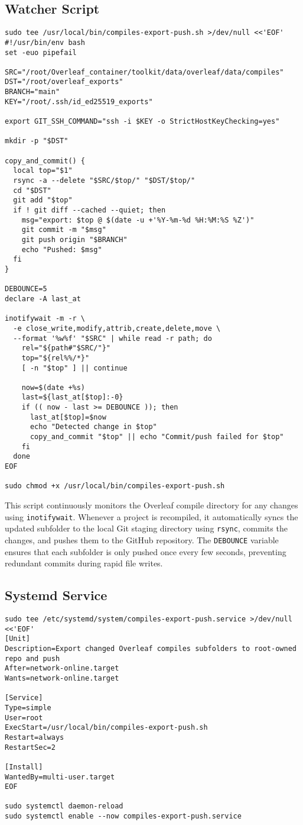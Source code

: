 \subsection*{Watcher Script}

\begin{verbatim}
sudo tee /usr/local/bin/compiles-export-push.sh >/dev/null <<'EOF'
#!/usr/bin/env bash
set -euo pipefail

SRC="/root/Overleaf_container/toolkit/data/overleaf/data/compiles"
DST="/root/overleaf_exports"
BRANCH="main"
KEY="/root/.ssh/id_ed25519_exports"

export GIT_SSH_COMMAND="ssh -i $KEY -o StrictHostKeyChecking=yes"

mkdir -p "$DST"

copy_and_commit() {
  local top="$1"
  rsync -a --delete "$SRC/$top/" "$DST/$top/"
  cd "$DST"
  git add "$top"
  if ! git diff --cached --quiet; then
    msg="export: $top @ $(date -u +'%Y-%m-%d %H:%M:%S %Z')"
    git commit -m "$msg"
    git push origin "$BRANCH"
    echo "Pushed: $msg"
  fi
}

DEBOUNCE=5
declare -A last_at

inotifywait -m -r \
  -e close_write,modify,attrib,create,delete,move \
  --format '%w%f' "$SRC" | while read -r path; do
    rel="${path#"$SRC/"}"
    top="${rel%%/*}"
    [ -n "$top" ] || continue

    now=$(date +%s)
    last=${last_at[$top]:-0}
    if (( now - last >= DEBOUNCE )); then
      last_at[$top]=$now
      echo "Detected change in $top"
      copy_and_commit "$top" || echo "Commit/push failed for $top"
    fi
  done
EOF

sudo chmod +x /usr/local/bin/compiles-export-push.sh
\end{verbatim}

This script continuously monitors the Overleaf compile directory for any changes using
\texttt{inotifywait}. Whenever a project is recompiled, it automatically syncs the updated
subfolder to the local Git staging directory using \texttt{rsync}, commits the changes, and
pushes them to the GitHub repository.  
The \texttt{DEBOUNCE} variable ensures that each subfolder is only pushed once every few
seconds, preventing redundant commits during rapid file writes.

\subsection*{Systemd Service}

\begin{verbatim}
sudo tee /etc/systemd/system/compiles-export-push.service >/dev/null <<'EOF'
[Unit]
Description=Export changed Overleaf compiles subfolders to root-owned repo and push
After=network-online.target
Wants=network-online.target

[Service]
Type=simple
User=root
ExecStart=/usr/local/bin/compiles-export-push.sh
Restart=always
RestartSec=2

[Install]
WantedBy=multi-user.target
EOF

sudo systemctl daemon-reload
sudo systemctl enable --now compiles-export-push.service
\end{verbatim}

